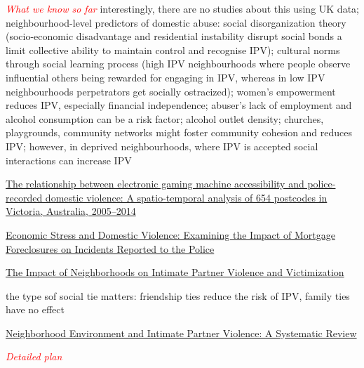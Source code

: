 \documentclass[11pt, a4paper]{article}
\begin{document}
\textcolor{red}{\textit{What we know so far}} interestingly, there are no studies about this using UK data; neighbourhood-level predictors of domestic abuse: social disorganization theory (socio-economic disadvantage and residential instability disrupt social bonds a limit collective ability to maintain control and recognise IPV); cultural norms through social learning process (high IPV neighbourhoods where people observe influential others being rewarded for engaging in IPV, whereas in low IPV neighbourhoods perpetrators get socially ostracized); women's empowerment reduces IPV, especially financial independence;  abuser's lack of employment and alcohol consumption can be a risk factor; alcohol outlet density; churches, playgrounds, community networks might foster community cohesion and reduces IPV;  however, in deprived neighbourhoods, where IPV is accepted social interactions can increase IPV

\href{https://www.sciencedirect.com/science/article/abs/pii/S0277953616302891}{The relationship between electronic gaming machine accessibility and police-recorded domestic violence: A spatio-temporal analysis of 654 postcodes in Victoria, Australia, 2005–2014}

\href{https://journals.sagepub.com/doi/abs/10.1177/1525107115623938}{Economic Stress and Domestic Violence: Examining the Impact of Mortgage Foreclosures on Incidents Reported to the Police }

\href{https://journals.sagepub.com/doi/abs/10.1177/1524838012445641?journalCode=tvaa}{
The Impact of Neighborhoods on Intimate Partner Violence and Victimization
}

the type sof social tie matters: friendship ties reduce the risk of IPV, family ties have no effect

\href{https://journals.sagepub.com/doi/abs/10.1177/1524838013515758}{Neighborhood Environment and Intimate Partner Violence: A Systematic Review }

\textcolor{red}{\textit{Detailed plan}}
\end{document}
